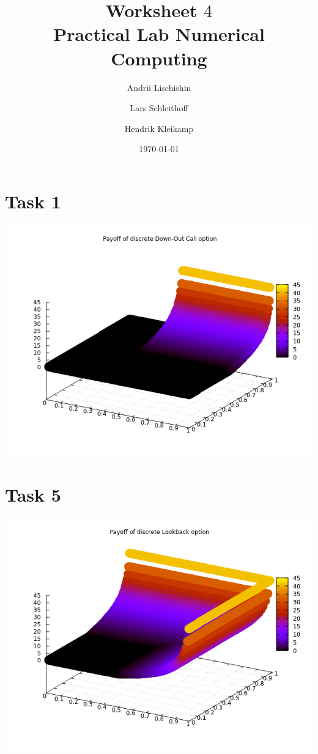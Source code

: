 \documentclass[10pt,a4paper]{article}
\begin{document}
\title{Worksheet $4$\\
\small{Practical Lab Numerical Computing}}
\author{Andrii Lischishin \and Lars Schleithoff \and Hendrik Kleikamp}
\date{\today}
\maketitle

\section*{Task 1}

\begin{center}
\includegraphics[scale=0.5]{payoff_down_out_call.png}
\end{center}

\section*{Task 5}

\begin{center}
	\includegraphics[scale=0.5]{payoff_lookback.png}
\end{center}
\end{document}
